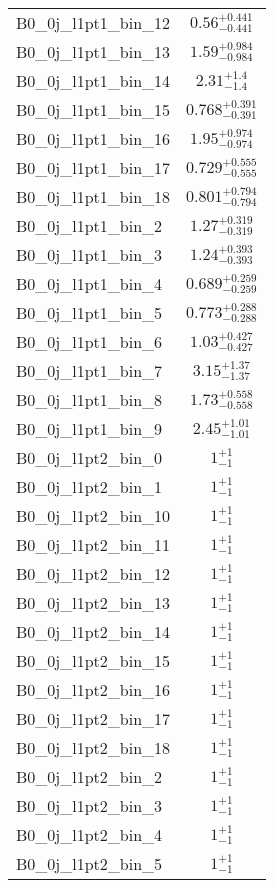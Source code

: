 \begin{tabular}{|l|c|}
B0\_0j\_l1pt1\_bin\_12 & $0.56^{+0.441}_{-0.441}$ \\
B0\_0j\_l1pt1\_bin\_13 & $1.59^{+0.984}_{-0.984}$ \\
B0\_0j\_l1pt1\_bin\_14 & $2.31^{+1.4}_{-1.4}$ \\
B0\_0j\_l1pt1\_bin\_15 & $0.768^{+0.391}_{-0.391}$ \\
B0\_0j\_l1pt1\_bin\_16 & $1.95^{+0.974}_{-0.974}$ \\
B0\_0j\_l1pt1\_bin\_17 & $0.729^{+0.555}_{-0.555}$ \\
B0\_0j\_l1pt1\_bin\_18 & $0.801^{+0.794}_{-0.794}$ \\
B0\_0j\_l1pt1\_bin\_2 & $1.27^{+0.319}_{-0.319}$ \\
B0\_0j\_l1pt1\_bin\_3 & $1.24^{+0.393}_{-0.393}$ \\
B0\_0j\_l1pt1\_bin\_4 & $0.689^{+0.259}_{-0.259}$ \\
B0\_0j\_l1pt1\_bin\_5 & $0.773^{+0.288}_{-0.288}$ \\
B0\_0j\_l1pt1\_bin\_6 & $1.03^{+0.427}_{-0.427}$ \\
B0\_0j\_l1pt1\_bin\_7 & $3.15^{+1.37}_{-1.37}$ \\
B0\_0j\_l1pt1\_bin\_8 & $1.73^{+0.558}_{-0.558}$ \\
B0\_0j\_l1pt1\_bin\_9 & $2.45^{+1.01}_{-1.01}$ \\
B0\_0j\_l1pt2\_bin\_0 & $1^{+1}_{-1}$ \\
B0\_0j\_l1pt2\_bin\_1 & $1^{+1}_{-1}$ \\
B0\_0j\_l1pt2\_bin\_10 & $1^{+1}_{-1}$ \\
B0\_0j\_l1pt2\_bin\_11 & $1^{+1}_{-1}$ \\
B0\_0j\_l1pt2\_bin\_12 & $1^{+1}_{-1}$ \\
B0\_0j\_l1pt2\_bin\_13 & $1^{+1}_{-1}$ \\
B0\_0j\_l1pt2\_bin\_14 & $1^{+1}_{-1}$ \\
B0\_0j\_l1pt2\_bin\_15 & $1^{+1}_{-1}$ \\
B0\_0j\_l1pt2\_bin\_16 & $1^{+1}_{-1}$ \\
B0\_0j\_l1pt2\_bin\_17 & $1^{+1}_{-1}$ \\
B0\_0j\_l1pt2\_bin\_18 & $1^{+1}_{-1}$ \\
B0\_0j\_l1pt2\_bin\_2 & $1^{+1}_{-1}$ \\
B0\_0j\_l1pt2\_bin\_3 & $1^{+1}_{-1}$ \\
B0\_0j\_l1pt2\_bin\_4 & $1^{+1}_{-1}$ \\
B0\_0j\_l1pt2\_bin\_5 & $1^{+1}_{-1}$ \\

\end{tabular}
